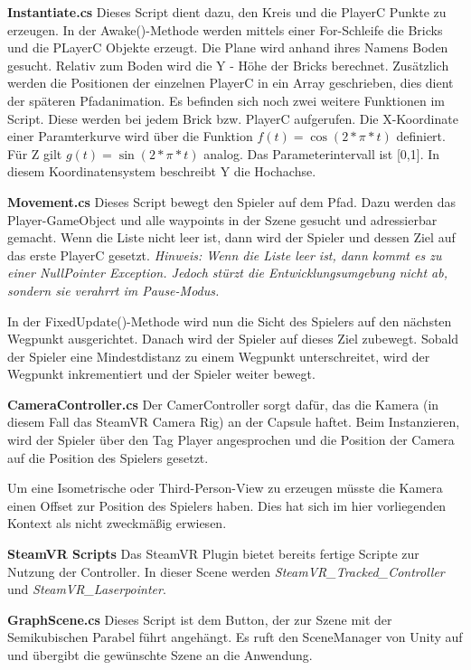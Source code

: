 
\textbf{Instantiate.cs}
Dieses Script dient dazu, den Kreis und die PlayerC Punkte zu erzeugen. In der Awake()-Methode werden mittels einer For-Schleife
die Bricks und die PLayerC Objekte erzeugt. Die Plane wird anhand ihres Namens \glqq Boden{}\grqq{} gesucht. Relativ zum Boden wird die Y - Höhe der Bricks berechnet.
Zusätzlich werden die Positionen der einzelnen PlayerC in ein Array geschrieben, dies dient der späteren Pfadanimation.
Es befinden sich noch zwei weitere Funktionen im Script. Diese werden bei jedem Brick bzw. PlayerC aufgerufen. Die X-Koordinate einer Paramterkurve wird über die Funktion $ f(t) = \cos(2 * \pi * t) $ definiert. Für Z gilt $g(t) = \sin(2 * \pi * t)$ analog. Das Parameterintervall ist [0,1]. In diesem Koordinatensystem beschreibt Y die Hochachse.


\textbf{Movement.cs}
Dieses Script bewegt den Spieler auf dem Pfad. Dazu werden das Player-GameObject und alle waypoints in der Szene gesucht und adressierbar gemacht.
Wenn die Liste nicht leer ist, dann wird der Spieler und dessen Ziel auf das erste PlayerC gesetzt. 
\emph{Hinweis: Wenn die Liste leer ist, dann kommt es zu einer NullPointer Exception. Jedoch stürzt die Entwicklungsumgebung nicht ab, sondern sie verahrrt im Pause-Modus.}

In der FixedUpdate()-Methode wird nun die Sicht des Spielers auf den nächsten Wegpunkt ausgerichtet. Danach wird der Spieler auf dieses Ziel zubewegt. Sobald der Spieler eine Mindestdistanz zu einem Wegpunkt unterschreitet, wird der Wegpunkt inkrementiert und der Spieler weiter bewegt.

\textbf{CameraController.cs}
Der CamerController sorgt dafür, das die Kamera (in diesem Fall das SteamVR Camera Rig) an der Capsule haftet. Beim Instanzieren, wird der Spieler über den Tag \glqq Player\grqq{} angesprochen und die Position der Camera auf die Position des Spielers gesetzt. 

Um eine Isometrische oder Third-Person-View zu erzeugen müsste die Kamera einen Offset zur Position des Spielers haben. Dies hat sich im hier vorliegenden Kontext als nicht zweckmäßig erwiesen. 

\textbf{SteamVR Scripts}
Das SteamVR Plugin bietet bereits fertige Scripte zur Nutzung der Controller. In dieser Scene werden \emph{SteamVR\_Tracked\_Controller} und \emph{SteamVR\_Laserpointer}. 


\textbf{GraphScene.cs}
Dieses Script ist dem Button, der zur Szene mit der Semikubischen Parabel führt angehängt. Es ruft den SceneManager von Unity auf und übergibt die gewünschte Szene an die Anwendung.

